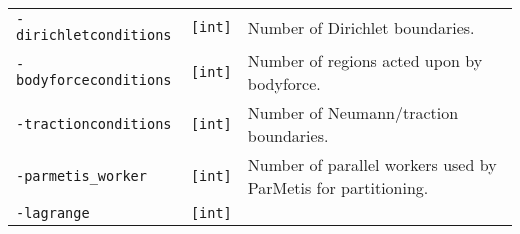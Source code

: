 \begin{longtable}[]{@{}lll@{}}
\begin{minipage}[t]{0.26\columnwidth}
\lstinline!-dirichletconditions!\strut
\end{minipage} & \begin{minipage}[t]{0.09\columnwidth}\raggedright\strut
\lstinline![int]!\strut
\end{minipage} & \begin{minipage}[t]{0.56\columnwidth}\raggedright\strut
Number of Dirichlet boundaries.\strut
\end{minipage}\tabularnewline
\begin{minipage}[t]{0.26\columnwidth}\raggedright\strut
\lstinline!-bodyforceconditions!\strut
\end{minipage} & \begin{minipage}[t]{0.09\columnwidth}\raggedright\strut
\lstinline![int]!\strut
\end{minipage} & \begin{minipage}[t]{0.56\columnwidth}\raggedright\strut
Number of regions acted upon by bodyforce.\strut
\end{minipage}\tabularnewline
\begin{minipage}[t]{0.26\columnwidth}\raggedright\strut
\lstinline!-tractionconditions!\strut
\end{minipage} & \begin{minipage}[t]{0.09\columnwidth}\raggedright\strut
\lstinline![int]!\strut
\end{minipage} & \begin{minipage}[t]{0.56\columnwidth}\raggedright\strut
Number of Neumann/traction boundaries.\strut
\end{minipage}\tabularnewline
\begin{minipage}[t]{0.26\columnwidth}\raggedright\strut
\lstinline!-parmetis_worker!\strut
\end{minipage} & \begin{minipage}[t]{0.09\columnwidth}\raggedright\strut
\lstinline![int]!\strut
\end{minipage} & \begin{minipage}[t]{0.56\columnwidth}\raggedright\strut
Number of parallel workers used by ParMetis for partitioning.\strut
\end{minipage}\tabularnewline
\begin{minipage}[t]{0.26\columnwidth}\raggedright\strut
\lstinline!-lagrange!\strut
\end{minipage} & \begin{minipage}[t]{0.09\columnwidth}\raggedright\strut
\lstinline![int]!\strut
\end{minipage} & \begin{minipage}[t]{0.56\columnwidth}\raggedright\strut

\end{minipage}
\end{longtable}
